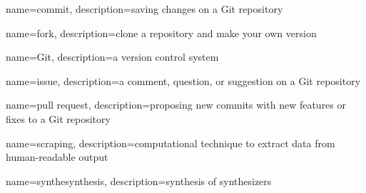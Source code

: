 {
    name={commit},
    description={saving changes on a Git repository}
}

{
    name={fork},
    description={clone a repository and make your own version}
}

{
    name={Git},
    description={a version control system}
}

{
    name={issue},
    description={a comment, question, or suggestion on a Git repository}
}

{
    name={pull request},
    description={proposing new commits with new features or fixes to a Git repository}
}

{
    name={scraping},
    description={computational technique to extract data from human-readable output}
}

{
    name={synthesynthesis},
    description={synthesis of synthesizers}
}
